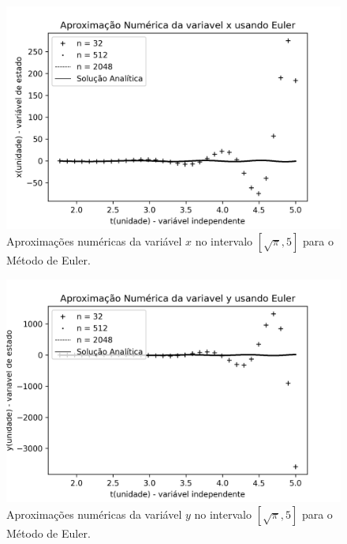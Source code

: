 \documentclass[twocolumn,amsmath,amssymb,floatfix]{revtex4}
\begin{document}
\begin{figure}[H]
\centering
\includegraphics[scale=0.55]{images/metodo_1x_T5.0.png}
\caption{Aproximações numéricas da variável $x$ no intervalo $[\sqrt{\pi},5]$ para o Método de Euler.}
\label{fig:m1t3}
\end{figure}

\begin{figure}[H]
\centering
\includegraphics[scale=0.55]{images/metodo_1y_T5.0.png}
\caption{Aproximações numéricas da variável $y$ no intervalo $[\sqrt{\pi},5]$ para o Método de Euler.}
\label{fig:m1t5}
\end{figure}
\end{document}
